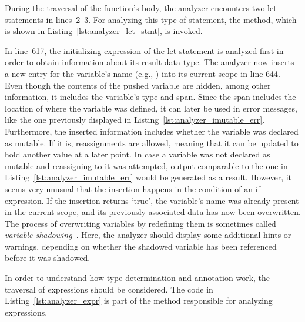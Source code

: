 During the traversal of the  function's body, the analyzer encounters two let-statements in lines~2--3.
For analyzing this type of statement, the  method, which is shown in Listing~\ref{lst:analyzer_let_stmt}, is invoked.


In line~617, the initializing expression of the let-statement is analyzed first in order to obtain information about its result data type.
The analyzer now inserts a new entry for the variable's name (e.g., ) into its current scope in line 644.
Even though the contents of the pushed variable are hidden, among other information, it includes the variable's type and span.
Since the span includes the location of where the variable was defined, it can later be used in error messages, like the one previously displayed in Listing~\ref{lst:analyzer_imutable_err}.
Furthermore, the inserted information includes whether the variable was declared as mutable.
If it is, reassignments are allowed, meaning that it can be updated to hold another value at a later point.
In case a variable was not declared as mutable and reassigning to it was attempted,
output comparable to the one in Listing~\ref{lst:analyzer_imutable_err} would be generated as a result.
However, it seems very unusual that the insertion happens in the condition of an if-expression.
If the insertion returns `true', the variable's name was already present in the current scope, and its previously associated data has now been overwritten.
The process of overwriting variables by redefining them is sometimes called \emph{variable shadowing}~\cite[p.~34]{Klabnik2019}.
Here, the analyzer should display some additional hints or warnings, depending on whether the shadowed variable has been referenced before it was shadowed.

In order to understand how type determination and annotation work, the traversal of expressions should be considered.
The code in Listing~\ref{lst:analyzer_expr} is part of the method responsible for analyzing expressions.


